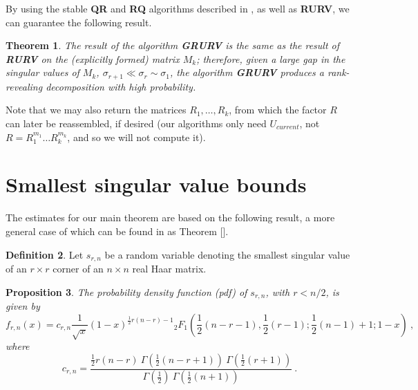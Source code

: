 \documentclass{article}
\newtheorem{theorem}{Theorem}[section]
\newtheorem{proposition}[theorem]{Proposition}
\theoremstyle{definition}
\newtheorem{definition}[theorem]{Definition}
\newcommand{\smin}{s_{r,n}}
\newcommand{\fmin}{f_{r,n}}
\begin{document}
By using the stable \textbf{QR} and \textbf{RQ} algorithms described in \cite{DDH07}, as well as \textbf{RURV}, we can guarantee the following result.

\begin{theorem} \label{thm_grurv} The result of the algorithm \textbf{GRURV} is the same as the result of 
\textbf{RURV} on the (explicitly formed) matrix $M_k$; therefore, given a large gap in the 
singular values of $M_k$, $\sigma_{r+1} \ll \sigma_r \sim \sigma_1$, 
the algorithm \textbf{GRURV} produces a rank-revealing decomposition with high probability.
\end{theorem}

Note that we may also return the matrices $R_1, \ldots, R_k$, from which the factor $R$ can later 
be reassembled, if desired (our algorithms only need $U_{current}$, not $R =R_1^{m_1} \ldots R_k^{m_k}$,
and so we will not compute it).


\section{Smallest singular value bounds}

The estimates for our main theorem are based on the following result, a more general case of which can be found in \cite{dumitriu?} as Theorem []. 

\begin{definition}
Let $\smin$ be a random variable denoting the smallest singular value of an $r\times r$ corner of an $n\times n$ real Haar matrix.
\end{definition}

\begin{proposition} The probability density function (pdf) of $\smin$, with $r < n/2$, is given by
\[
\fmin(x) = c_{r,n} \frac{1}{\sqrt{x}} (1 - x)^{\frac{1}{2}r(n-r)-1}  {_{2}F_{1}} \left ( \frac{1}{2}(n-r-1), \frac{1}{2}(r-1); \frac{1}{2}(n-1)+1; 1-x \right)~,
\]
where
\[
c_{r,n} = \frac{\frac{1}{2}r(n-r) ~\Gamma \left( \frac{1}{2}(n-r+1) \right) ~\Gamma \left ( \frac{1}{2}(r+1) \right)}{\Gamma \left (\frac{1}{2} \right) ~\Gamma \left ( \frac{1}{2} (n+1) \right)}~.
\]
\end{proposition}
\end{document}
